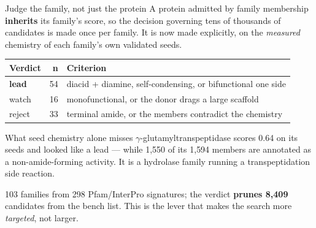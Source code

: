 \documentclass[aspectratio=169,10pt]{beamer}
\newcommand{\good}[1]{{\color{cGood}\textbf{#1}}}
\newcommand{\bad}[1]{{\color{cBad}#1}}
\newcommand{\takeaway}[1]{\vfill\begin{tcolorbox}[colback=structure!12!white,
  colframe=structure!60!black,boxrule=0.4pt,left=5pt,right=5pt,top=3pt,bottom=3pt]
  \small #1\end{tcolorbox}}
\begin{document}
\begin{frame}{Judge the family, not just the protein}
  A protein admitted by family membership \textbf{inherits} its family's score,
  so the decision governing tens of thousands of candidates is made once per
  family. It is now made explicitly, on the \emph{measured} chemistry of each
  family's own validated seeds.

  \smallskip
  \centering
  \begin{tabular}{lrl}
    \toprule
    \textbf{Verdict} & \textbf{n} & \textbf{Criterion} \\
    \midrule
    \good{lead}  & 54 & diacid + diamine, self-condensing, or bifunctional one side \\
    watch        & 16 & monofunctional, or the donor drags a large scaffold \\
    \bad{reject} & 33 & terminal amide, or the members contradict the chemistry \\
    \bottomrule
  \end{tabular}

  \smallskip
  \begin{block}{What seed chemistry alone misses}
    $\gamma$-glutamyltranspeptidase scores 0.64 on its seeds and looked like a
    lead --- while \bad{1{,}550 of its 1{,}594 members} are annotated as a
    non-amide-forming activity. It is a hydrolase family running a
    transpeptidation side reaction.
  \end{block}

  \takeaway{103 families from 298 Pfam/InterPro signatures; the verdict
  \textbf{prunes 8{,}409} candidates from the bench list. This is the lever
  that makes the search more \emph{targeted}, not larger.}
\end{frame}
\end{document}
